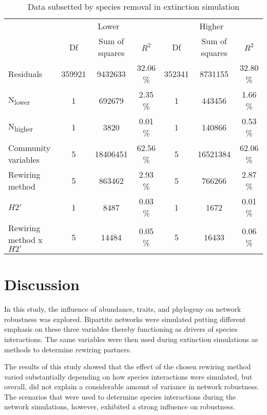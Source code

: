 \documentclass[12pt,a4paper]{article}
\begin{document}
\begin{table}[H]
\begin{subtable}{\linewidth}
\caption{Data subsetted by species removal in extinction simulation}
\label{tab:anova_lo_hi}
\begin{tabularx}{\linewidth}{@{} X *6{c} @{}}
\toprule
  & \multicolumn{3}{c}{Lower} & \multicolumn{3}{c}{Higher} \\ \cmidrule(l){2-4} \cmidrule(l){5-7} 
  						& Df 	& Sum of squares	& $R^2$ 		& Df 	& Sum of squares 	& $R^2$  \\ \midrule
Residuals 				& 359921 & 9432633 		& 32.06 \% 	& 352341	& 8731155 			& 32.80 \%\\ 
N\textsubscript{lower} 	& 1 		& 692679 		& 2.35 \% 	& 1 		& 443456 			& 1.66 \%\\
N\textsubscript{higher} 	& 1 		& 3820 			& 0.01 \% 	& 1 		& 140866 			& 0.53 \%\\
Community variables 		& 5 		& 18406451 		& 62.56 \% 	& 5 		& 16521384 			& 62.06 \%\\
Rewiring method 			& 5 		& 863462			& 2.93 \% 	& 5 		& 766266				& 2.87 \%\\ 
$H2'$ 					& 1 		& 8487 			& 0.03 \% 	& 1 		& 1672 				& 0.01 \%\\
Rewiring method x $H2'$ 	& 5 		& 14484 			& 0.05 \% 	& 5 		& 16433				& 0.06 \%\\ \bottomrule
\end{tabularx}
\end{subtable}
\medskip
\end{table}


	\section{Discussion}

In this study, the influence of abundance, traits, and phylogeny on network robustness was explored. Bipartite networks were simulated putting different emphasis on these three variables thereby functioning as drivers of species interactions. The same variables were then used during extinction simulations as methods to determine rewiring partners.\par
The results of this study showed that the effect of the chosen rewiring method varied substantially depending on how species interactions were simulated, but overall, did not explain a considerable amount of variance in network robustness. The scenarios that were used to determine species interactions during the network simulations, however, exhibited a strong influence on robustness. \paragraph{}
\end{document}

